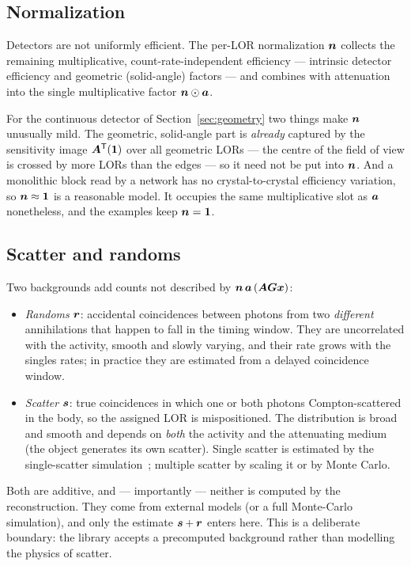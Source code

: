 \subsection{Normalization}
\label{sec:datamodel:norm}

Detectors are not uniformly efficient. The per-LOR normalization $\bm{n}$ collects
the remaining multiplicative, count-rate-independent efficiency --- intrinsic
detector efficiency and geometric (solid-angle) factors --- and combines with
attenuation into the single multiplicative factor $\bm{n}\odot\bm{a}$.

For the continuous detector of Section~\ref{sec:geometry} two things make $\bm{n}$
unusually mild. The geometric, solid-angle part is \emph{already} captured by the
sensitivity image $\bm{A}^{\mathsf{T}}(\bm 1)$ over all geometric LORs --- the centre of the
field of view is crossed by more LORs than the edges --- so it need not be put
into $\bm{n}$. And a monolithic block read by a network has no crystal-to-crystal
efficiency variation, so $\bm{n}\approx\bm1$ is a reasonable model. It occupies the
same multiplicative slot as $\bm{a}$ nonetheless, and the examples keep
$\bm{n}=\bm1$.

\subsection{Scatter and randoms}
\label{sec:datamodel:background}

Two backgrounds add counts not described by $\bm{n}\,\bm{a}\,(\bm{A}\bm{G}\bm{x})$:
\begin{itemize}
  \item \emph{Randoms} $\bm{r}$: accidental coincidences between photons from two
        \emph{different} annihilations that happen to fall in the timing window.
        They are uncorrelated with the activity, smooth and slowly varying, and
        their rate grows with the singles rates; in practice they are estimated
        from a delayed coincidence window.
  \item \emph{Scatter} $\bm{s}$: true coincidences in which one or both photons
        Compton-scattered in the body, so the assigned LOR is mispositioned. The
        distribution is broad and smooth and depends on \emph{both} the activity
        and the attenuating medium (the object generates its own scatter). Single
        scatter is estimated by the single-scatter simulation~\cite{watson2000};
        multiple scatter by scaling it or by Monte Carlo.
\end{itemize}
Both are additive, and --- importantly --- neither is computed by the
reconstruction. They come from external models (or a full Monte-Carlo
simulation), and only the estimate $\bm{s}+\bm{r}$ enters here. This is a deliberate
boundary: the library accepts a precomputed background rather than modelling the
physics of scatter.

